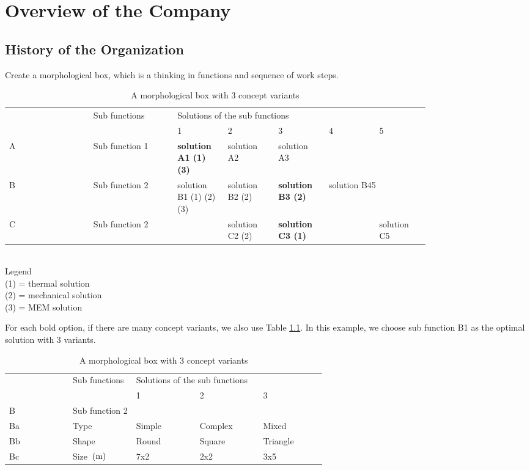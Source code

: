 \chapter{Overview of the Company}
\section{History of the Organization }
Create a morphological box, which is a thinking in functions and sequence of work steps.
\begin{table}[ht]
	\centering
	\begin{tabular}{lp{0.2\linewidth}p{0.12\linewidth}p{0.12\linewidth}p{0.12\linewidth}p{0.12\linewidth}p{0.12\linewidth}}\toprule
		\multirow{2}{*}{} & \multirow{2}{*}{Sub functions} & \multicolumn{5}{l}{Solutions of the sub functions}\\\cmidrule{3-7}
		& & 1 & 2 & 3 & 4 & 5\\
		\midrule
		A & Sub function 1 & \textbf{solution A1 (1) (3)} & solution A2 & solution A3 & &\\
		B & Sub function 2 & solution B1 (1) (2) (3) & solution B2 (2) & \textbf{solution B3 (2)} & \multicolumn{2}{l}{solution B45} \\
		C & Sub function 2 &  & solution C2 (2)  & \textbf{solution C3 (1)} & & solution C5 \\\bottomrule
	\end{tabular}
	\caption{A morphological box with 3 concept variants}
\end{table}\\
Legend\\
(1) = thermal solution\\
(2) = mechanical solution\\
(3) = MEM solution

For each bold option, if there are many concept variants, we also use Table \ref{subsub}. In this example, we choose sub function B1 as the optimal solution with 3 variants.
\begin{table}[ht]
	\centering
	\begin{tabular}{lp{0.2\linewidth}p{0.2\linewidth}p{0.2\linewidth}p{0.2\linewidth}}\toprule
		\multirow{2}{*}{} & \multirow{2}{*}{Sub functions} & \multicolumn{3}{l}{Solutions of the sub functions}\\\cmidrule{3-5}
		& & 1 & 2 & 3\\
		\midrule
		B & Sub function 2 & & & \\
		Ba & Type  &  Simple & Complex  & Mixed \\
		Bb & Shape & Round & Square & Triangle  \\
		Bc & Size $ \, (\mathrm{m}) $  & 7x2 & 2x2 & 3x5 \\\bottomrule
	\end{tabular}
	\caption{A morphological box with 3 concept variants}
	\label{subsub}
\end{table}